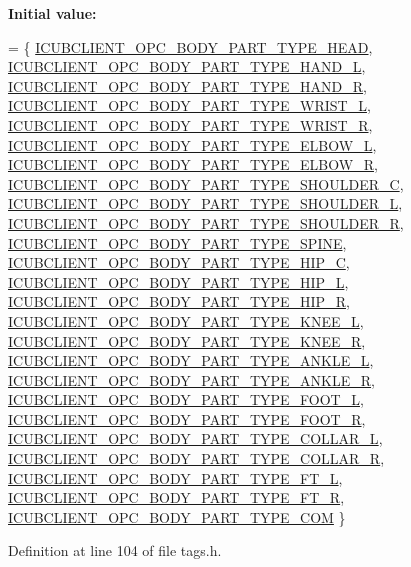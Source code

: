 {\bfseries Initial value\+:}
\begin{DoxyCode}
= \{
    \hyperlink{group__icubclient__tags_gaa02aa07eae126204dbe8b5c2af195d32}{ICUBCLIENT\_OPC\_BODY\_PART\_TYPE\_HEAD},
    \hyperlink{group__icubclient__tags_gacaaedb258ff7e0352008bc9e40b798ca}{ICUBCLIENT\_OPC\_BODY\_PART\_TYPE\_HAND\_L},
    \hyperlink{group__icubclient__tags_gae2b60e6d7fdc2446affb4e12c9dc2a48}{ICUBCLIENT\_OPC\_BODY\_PART\_TYPE\_HAND\_R},
    \hyperlink{group__icubclient__tags_gaeba18fe718ae272c328d8a7be81fe82e}{ICUBCLIENT\_OPC\_BODY\_PART\_TYPE\_WRIST\_L},
    \hyperlink{group__icubclient__tags_ga56da7b9d06ef0ff7b65e2d6a87be20f5}{ICUBCLIENT\_OPC\_BODY\_PART\_TYPE\_WRIST\_R},
    \hyperlink{group__icubclient__tags_gab86fd7975a074ae0200fc921f24b8b27}{ICUBCLIENT\_OPC\_BODY\_PART\_TYPE\_ELBOW\_L},
    \hyperlink{group__icubclient__tags_ga97554fb72caba6d7bd4e545d989ce838}{ICUBCLIENT\_OPC\_BODY\_PART\_TYPE\_ELBOW\_R},
    \hyperlink{group__icubclient__tags_gad28d9d48aa9da3eee85e3ab136e1d172}{ICUBCLIENT\_OPC\_BODY\_PART\_TYPE\_SHOULDER\_C},
    \hyperlink{group__icubclient__tags_gaa1a8f97d3e6094132e48f329d8d2e0fa}{ICUBCLIENT\_OPC\_BODY\_PART\_TYPE\_SHOULDER\_L},
    \hyperlink{group__icubclient__tags_ga4bda4a9f28859eeff000453a21b99884}{ICUBCLIENT\_OPC\_BODY\_PART\_TYPE\_SHOULDER\_R},
    \hyperlink{group__icubclient__tags_gadfd60827870d145a5ac23ee6876660a4}{ICUBCLIENT\_OPC\_BODY\_PART\_TYPE\_SPINE},
    \hyperlink{group__icubclient__tags_ga5b66f7452f0824d540be80515b8a3cf3}{ICUBCLIENT\_OPC\_BODY\_PART\_TYPE\_HIP\_C},
    \hyperlink{group__icubclient__tags_ga5ad224603f5735d53f970eac5bd1ba0b}{ICUBCLIENT\_OPC\_BODY\_PART\_TYPE\_HIP\_L},
    \hyperlink{group__icubclient__tags_gafb4f4f5458f4914d1199fd44e3b3da50}{ICUBCLIENT\_OPC\_BODY\_PART\_TYPE\_HIP\_R},
    \hyperlink{group__icubclient__tags_ga3f3e6e7476a25bc15509b219f25c2a37}{ICUBCLIENT\_OPC\_BODY\_PART\_TYPE\_KNEE\_L},
    \hyperlink{group__icubclient__tags_gabb265e235a73a3a8890e93eb6aab1832}{ICUBCLIENT\_OPC\_BODY\_PART\_TYPE\_KNEE\_R},
    \hyperlink{group__icubclient__tags_gae2fe87aed7479cccc93d97d603707a53}{ICUBCLIENT\_OPC\_BODY\_PART\_TYPE\_ANKLE\_L},
    \hyperlink{group__icubclient__tags_gab70f6f0b598ebe2ac71cf5c24bda7ac8}{ICUBCLIENT\_OPC\_BODY\_PART\_TYPE\_ANKLE\_R},
    \hyperlink{group__icubclient__tags_ga045f54dec7f94b4bbef957fe07ce3428}{ICUBCLIENT\_OPC\_BODY\_PART\_TYPE\_FOOT\_L},
    \hyperlink{group__icubclient__tags_ga229d2650f1f91c29f32fc50289e9df33}{ICUBCLIENT\_OPC\_BODY\_PART\_TYPE\_FOOT\_R},
    \hyperlink{group__icubclient__tags_gaf71b150f59ff5a698f31e7e41875d50c}{ICUBCLIENT\_OPC\_BODY\_PART\_TYPE\_COLLAR\_L},
    \hyperlink{group__icubclient__tags_gabffc87f95deae5505b46c6b098a837d2}{ICUBCLIENT\_OPC\_BODY\_PART\_TYPE\_COLLAR\_R},
    \hyperlink{group__icubclient__tags_ga2f3a37ba417d4d391c0c50b0e1012bc3}{ICUBCLIENT\_OPC\_BODY\_PART\_TYPE\_FT\_L},
    \hyperlink{group__icubclient__tags_ga4d8fa4ce73c15727bed37ca1471aeb64}{ICUBCLIENT\_OPC\_BODY\_PART\_TYPE\_FT\_R},
    \hyperlink{group__icubclient__tags_gac317fafa24f5b19ae63035af5f4103ea}{ICUBCLIENT\_OPC\_BODY\_PART\_TYPE\_COM}
\}
\end{DoxyCode}


Definition at line 104 of file tags.\+h.

